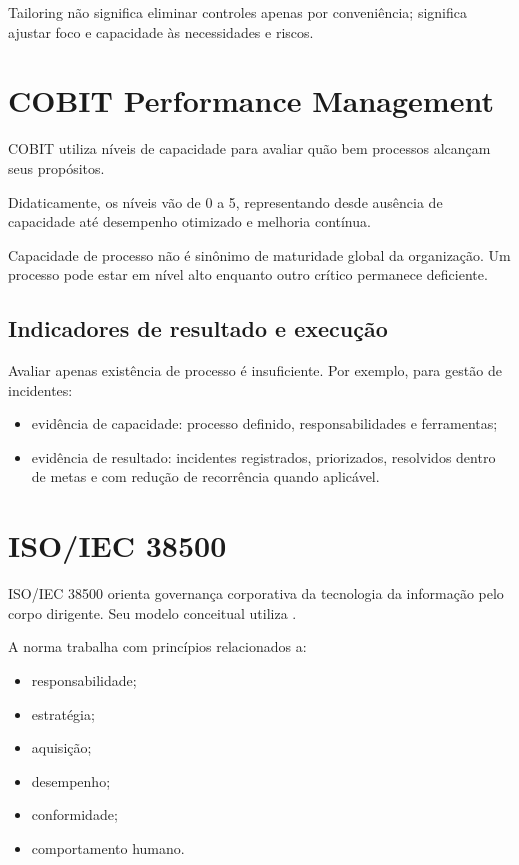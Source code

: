 Tailoring não significa eliminar controles apenas por conveniência; significa ajustar foco e capacidade às necessidades e riscos.

\section{COBIT Performance Management}

COBIT utiliza níveis de capacidade para avaliar quão bem processos alcançam seus propósitos.

Didaticamente, os níveis vão de 0 a 5, representando desde ausência de capacidade até desempenho otimizado e melhoria contínua.

Capacidade de processo não é sinônimo de maturidade global da organização. Um processo pode estar em nível alto enquanto outro crítico permanece deficiente.

\subsection{Indicadores de resultado e execução}

Avaliar apenas existência de processo é insuficiente. Por exemplo, para gestão de incidentes:
\begin{itemize}
\item evidência de capacidade: processo definido, responsabilidades e ferramentas;
\item evidência de resultado: incidentes registrados, priorizados, resolvidos dentro de metas e com redução de recorrência quando aplicável.
\end{itemize}

\section{ISO/IEC 38500}

ISO/IEC 38500 orienta governança corporativa da tecnologia da informação pelo corpo dirigente. Seu modelo conceitual utiliza .

A norma trabalha com princípios relacionados a:
\begin{itemize}
\item responsabilidade;
\item estratégia;
\item aquisição;
\item desempenho;
\item conformidade;
\item comportamento humano.
\end{itemize}

